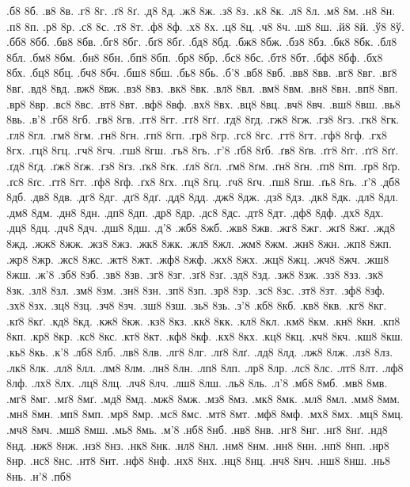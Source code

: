 {%
.б8
8б.
.в8
8в.
.г8
8г.
.ґ8
8ґ.
.д8
8д.
.ж8
8ж.
.з8
8з.
.к8
8к.
.л8
8л.
.м8
8м.
.н8
8н.
.п8
8п.
.р8
8р.
.с8
8с.
.т8
8т.
.ф8
8ф.
.х8
8х.
.ц8
8ц.
.ч8
8ч.
.ш8
8ш.
.й8
8й.
.ў8
8ў.
.бб8
8бб.
.бв8
8бв.
.бг8
8бг.
.бґ8
8бґ.
.бд8
8бд.
.бж8
8бж.
.бз8
8бз.
.бк8
8бк.
.бл8
8бл.
.бм8
8бм.
.бн8
8бн.
.бп8
8бп.
.бр8
8бр.
.бс8
8бс.
.бт8
8бт.
.бф8
8бф.
.бх8
8бх.
.бц8
8бц.
.бч8
8бч.
.бш8
8бш.
.бь8
8бь.
.б'8
.вб8
8вб.
.вв8
8вв.
.вг8
8вг.
.вґ8
8вґ.
.вд8
8вд.
.вж8
8вж.
.вз8
8вз.
.вк8
8вк.
.вл8
8вл.
.вм8
8вм.
.вн8
8вн.
.вп8
8вп.
.вр8
8вр.
.вс8
8вс.
.вт8
8вт.
.вф8
8вф.
.вх8
8вх.
.вц8
8вц.
.вч8
8вч.
.вш8
8вш.
.вь8
8вь.
.в'8
.гб8
8гб.
.гв8
8гв.
.гг8
8гг.
.гґ8
8гґ.
.гд8
8гд.
.гж8
8гж.
.гз8
8гз.
.гк8
8гк.
.гл8
8гл.
.гм8
8гм.
.гн8
8гн.
.гп8
8гп.
.гр8
8гр.
.гс8
8гс.
.гт8
8гт.
.гф8
8гф.
.гх8
8гх.
.гц8
8гц.
.гч8
8гч.
.гш8
8гш.
.гь8
8гь.
.г'8
.ґб8
8ґб.
.ґв8
8ґв.
.ґг8
8ґг.
.ґґ8
8ґґ.
.ґд8
8ґд.
.ґж8
8ґж.
.ґз8
8ґз.
.ґк8
8ґк.
.ґл8
8ґл.
.ґм8
8ґм.
.ґн8
8ґн.
.ґп8
8ґп.
.ґр8
8ґр.
.ґс8
8ґс.
.ґт8
8ґт.
.ґф8
8ґф.
.ґх8
8ґх.
.ґц8
8ґц.
.ґч8
8ґч.
.ґш8
8ґш.
.ґь8
8ґь.
.ґ'8
.дб8
8дб.
.дв8
8дв.
.дг8
8дг.
.дґ8
8дґ.
.дд8
8дд.
.дж8
8дж.
.дз8
8дз.
.дк8
8дк.
.дл8
8дл.
.дм8
8дм.
.дн8
8дн.
.дп8
8дп.
.др8
8др.
.дс8
8дс.
.дт8
8дт.
.дф8
8дф.
.дх8
8дх.
.дц8
8дц.
.дч8
8дч.
.дш8
8дш.
.д'8
.жб8
8жб.
.жв8
8жв.
.жг8
8жг.
.жґ8
8жґ.
.жд8
8жд.
.жж8
8жж.
.жз8
8жз.
.жк8
8жк.
.жл8
8жл.
.жм8
8жм.
.жн8
8жн.
.жп8
8жп.
.жр8
8жр.
.жс8
8жс.
.жт8
8жт.
.жф8
8жф.
.жх8
8жх.
.жц8
8жц.
.жч8
8жч.
.жш8
8жш.
.ж'8
.зб8
8зб.
.зв8
8зв.
.зг8
8зг.
.зґ8
8зґ.
.зд8
8зд.
.зж8
8зж.
.зз8
8зз.
.зк8
8зк.
.зл8
8зл.
.зм8
8зм.
.зн8
8зн.
.зп8
8зп.
.зр8
8зр.
.зс8
8зс.
.зт8
8зт.
.зф8
8зф.
.зх8
8зх.
.зц8
8зц.
.зч8
8зч.
.зш8
8зш.
.зь8
8зь.
.з'8
.кб8
8кб.
.кв8
8кв.
.кг8
8кг.
.кґ8
8кґ.
.кд8
8кд.
.кж8
8кж.
.кз8
8кз.
.кк8
8кк.
.кл8
8кл.
.км8
8км.
.кн8
8кн.
.кп8
8кп.
.кр8
8кр.
.кс8
8кс.
.кт8
8кт.
.кф8
8кф.
.кх8
8кх.
.кц8
8кц.
.кч8
8кч.
.кш8
8кш.
.кь8
8кь.
.к'8
.лб8
8лб.
.лв8
8лв.
.лг8
8лг.
.лґ8
8лґ.
.лд8
8лд.
.лж8
8лж.
.лз8
8лз.
.лк8
8лк.
.лл8
8лл.
.лм8
8лм.
.лн8
8лн.
.лп8
8лп.
.лр8
8лр.
.лс8
8лс.
.лт8
8лт.
.лф8
8лф.
.лх8
8лх.
.лц8
8лц.
.лч8
8лч.
.лш8
8лш.
.ль8
8ль.
.л'8
.мб8
8мб.
.мв8
8мв.
.мг8
8мг.
.мґ8
8мґ.
.мд8
8мд.
.мж8
8мж.
.мз8
8мз.
.мк8
8мк.
.мл8
8мл.
.мм8
8мм.
.мн8
8мн.
.мп8
8мп.
.мр8
8мр.
.мс8
8мс.
.мт8
8мт.
.мф8
8мф.
.мх8
8мх.
.мц8
8мц.
.мч8
8мч.
.мш8
8мш.
.мь8
8мь.
.м'8
.нб8
8нб.
.нв8
8нв.
.нг8
8нг.
.нґ8
8нґ.
.нд8
8нд.
.нж8
8нж.
.нз8
8нз.
.нк8
8нк.
.нл8
8нл.
.нм8
8нм.
.нн8
8нн.
.нп8
8нп.
.нр8
8нр.
.нс8
8нс.
.нт8
8нт.
.нф8
8нф.
.нх8
8нх.
.нц8
8нц.
.нч8
8нч.
.нш8
8нш.
.нь8
8нь.
.н'8
.пб8
}
